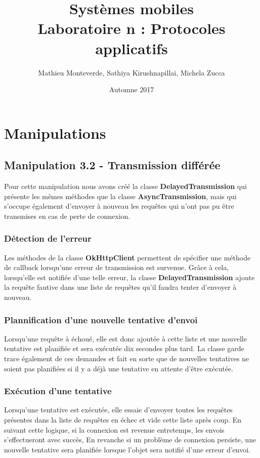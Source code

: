 \documentclass[francais,12pt]{article}
\title{Systèmes mobiles \\ Laboratoire n\textordmasculine2 : Protocoles applicatifs}
\author{Mathieu Monteverde, Sathiya Kirushnapillai, Michela Zucca}
\date{Automne 2017}
\begin{document}
	
	\maketitle
	
	\setlength{\parskip}{1em}
	
	\section*{Manipulations}
	
	\subsection*{Manipulation 3.2 - Transmission différée}
	
	Pour cette manipulation nous avons créé la classe \textbf{DelayedTransmission} qui présente les mêmes méthodes que la classe \textbf{AsyncTransmission}, mais qui s'occupe également d'envoyer à nouveau les requêtes qui n'ont pas pu être transmises en cas de perte de connexion. 
	
	\subsubsection*{Détection de l'erreur}
	Les méthodes de la classe \textbf{OkHttpClient} permettent de spécifier une méthode de callback lorsqu'une erreur de transmission est survenue. Grâce à cela, lorsqu'elle est notifiée d'une telle erreur, la classe \textbf{DelayedTransmission} ajoute la requête fautive dans une liste de requêtes qu'il faudra tenter d'envoyer à nouveau. 
	
	\subsubsection*{Plannification d'une nouvelle tentative d'envoi}
	Lorsqu'une requête à échoué, elle est donc ajoutée à cette liste et une nouvelle tentative est planifiée et sera exécutée dix secondes plus tard. La classe garde trace également de ces demandes et fait en sorte que de nouvelles tentatives ne soient pas planifiées si il y a déjà une tentative en attente d'être exécutée.
	
	\subsubsection*{Exécution d'une tentative}
	Lorsqu'une tentative est exécutée, elle essaie d'envoyer toutes les requêtes présentes dans la liste de requêtes en échec et vide cette liste après coup. En suivant cette logique, si la connexion est revenue entretemps, les envois s'effectueront avec succès, En revanche si un problème de connexion persiste, une nouvelle tentative sera planifiée lorsque l'objet sera notifié d'une erreur d'envoi. 
	
\end{document}
